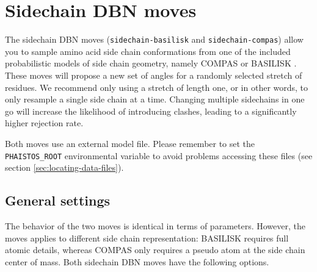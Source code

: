 
\section{Sidechain DBN moves}
\label{sec:sidechain-move-dbn}

The sidechain DBN moves (\texttt{sidechain-basilisk} and \texttt{sidechain-compas})
allow you to sample amino acid side chain conformations from one of
the included probabilistic models of side chain geometry, namely
COMPAS or BASILISK \cite{harder2010beyond}.  These moves will propose
a new set of angles for a randomly selected stretch of residues. We
recommend only using a stretch of length one, or in other words, to
only resample a single side chain at a time. Changing multiple
sidechains in one go will increase the likelihood of introducing
clashes, leading to a significantly higher rejection rate.

Both moves use an external model file. Please remember to set the
\texttt{PHAISTOS\_ROOT} environmental variable to avoid problems
accessing these files (see section \ref{sec:locating-data-files}).

\subsection{General settings}

The behavior of the two moves is identical in terms of
parameters. However, the moves applies to different side chain
representation: BASILISK requires full atomic details, whereas COMPAS
only requires a pseudo atom at the side chain center of mass.  Both
sidechain DBN moves have the following options.

\begin{optiontable}

\end{optiontable}

